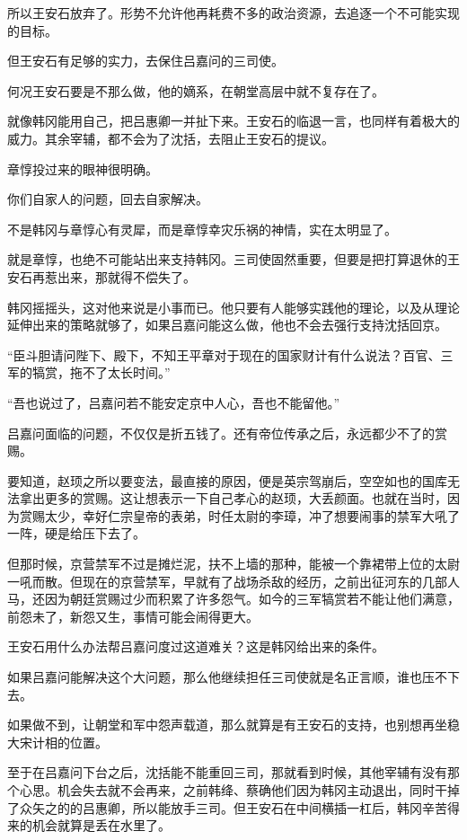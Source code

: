 所以王安石放弃了。形势不允许他再耗费不多的政治资源，去追逐一个不可能实现的目标。

但王安石有足够的实力，去保住吕嘉问的三司使。

何况王安石要是不那么做，他的嫡系，在朝堂高层中就不复存在了。

就像韩冈能用自己，把吕惠卿一并扯下来。王安石的临退一言，也同样有着极大的威力。其余宰辅，都不会为了沈括，去阻止王安石的提议。

章惇投过来的眼神很明确。

你们自家人的问题，回去自家解决。

不是韩冈与章惇心有灵犀，而是章惇幸灾乐祸的神情，实在太明显了。

就是章惇，也绝不可能站出来支持韩冈。三司使固然重要，但要是把打算退休的王安石再惹出来，那就得不偿失了。

韩冈摇摇头，这对他来说是小事而已。他只要有人能够实践他的理论，以及从理论延伸出来的策略就够了，如果吕嘉问能这么做，他也不会去强行支持沈括回京。

“臣斗胆请问陛下、殿下，不知王平章对于现在的国家财计有什么说法？百官、三军的犒赏，拖不了太长时间。”

“吾也说过了，吕嘉问若不能安定京中人心，吾也不能留他。”

吕嘉问面临的问题，不仅仅是折五钱了。还有帝位传承之后，永远都少不了的赏赐。

要知道，赵顼之所以要变法，最直接的原因，便是英宗驾崩后，空空如也的国库无法拿出更多的赏赐。这让想表示一下自己孝心的赵顼，大丢颜面。也就在当时，因为赏赐太少，幸好仁宗皇帝的表弟，时任太尉的李璋，冲了想要闹事的禁军大吼了一阵，硬是给压下去了。

但那时候，京营禁军不过是摊烂泥，扶不上墙的那种，能被一个靠裙带上位的太尉一吼而散。但现在的京营禁军，早就有了战场杀敌的经历，之前出征河东的几部人马，还因为朝廷赏赐过少而积累了许多怨气。如今的三军犒赏若不能让他们满意，前怨未了，新怨又生，事情可能会闹得更大。

王安石用什么办法帮吕嘉问度过这道难关？这是韩冈给出来的条件。

如果吕嘉问能解决这个大问题，那么他继续担任三司使就是名正言顺，谁也压不下去。

如果做不到，让朝堂和军中怨声载道，那么就算是有王安石的支持，也别想再坐稳大宋计相的位置。

至于在吕嘉问下台之后，沈括能不能重回三司，那就看到时候，其他宰辅有没有那个心思。机会失去就不会再来，之前韩绛、蔡确他们因为韩冈主动退出，同时干掉了众矢之的的吕惠卿，所以能放手三司。但王安石在中间横插一杠后，韩冈辛苦得来的机会就算是丢在水里了。

